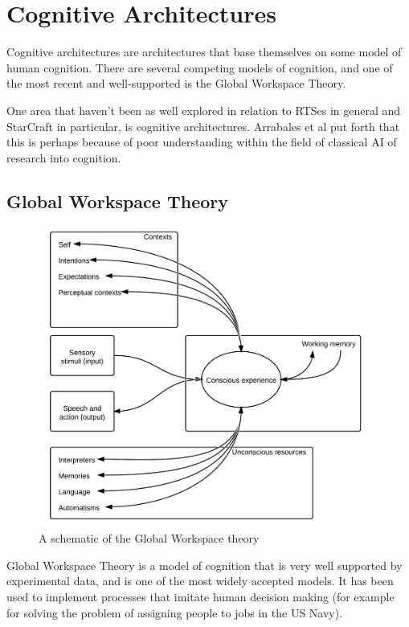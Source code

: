 \section{Cognitive Architectures}
\label{sec:cogarch}
Cognitive architectures are architectures that base themselves on some model of
human cognition. There are several competing models of cognition, and one of
the most recent and well-supported is the Global Workspace Theory.

One area that haven't been as well explored in relation to RTSes in general and
StarCraft in particular, is cognitive architectures. Arrabales et al put forth
that this is perhaps because of poor understanding within the field of classical
AI of research into cognition\cite{arrabales2009gamechars}.

\subsection{Global Workspace Theory}

\begin{figure}[h!tb]
\centering
\includegraphics[scale=1.0]{graphics/globalworkspace.png}
\caption{A schematic of the Global Workspace theory\cite{baars2005gwt}}
\label{fig:gwt}
\end{figure}

Global Workspace Theory is a model of cognition that is very well supported by
experimental data, and is one of the most widely accepted models.
\cite{dehaene2001towards} It has been used to implement processes that imitate
human decision making (for example for solving the problem of assigning people
to jobs in the US Navy).\cite{baars2005gwt}\cite{franklin2003interacting}

